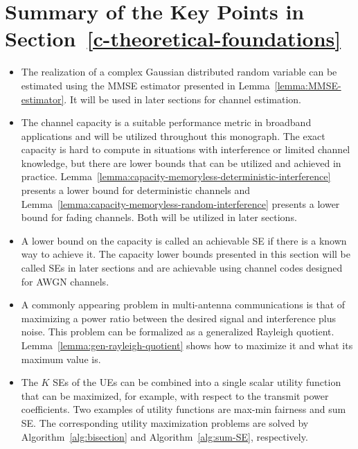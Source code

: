 \newpage

\section{Summary of the Key Points in Section~\ref{c-theoretical-foundations}}
\label{c-theoretical-foundations-summary}

\begin{mdframed}[style=GrayFrame]

\begin{itemize}
\item The realization of a complex Gaussian distributed random variable can be estimated using the \gls{MMSE} estimator presented in Lemma~\ref{lemma:MMSE-estimator}. It will be used in later sections for channel estimation.

\item The channel capacity is a suitable performance metric in broadband applications and will be utilized throughout this monograph. The exact capacity is hard to compute in situations with interference or limited channel knowledge, but there are lower bounds that can be utilized and achieved in practice. Lemma~\ref{lemma:capacity-memoryless-deterministic-interference} presents a lower bound for deterministic channels and Lemma~\ref{lemma:capacity-memoryless-random-interference} presents a lower bound for fading channels. Both will be utilized in later sections.

\item A lower bound on the capacity is called an achievable SE if there is a known way to achieve it. The capacity lower bounds presented in this section will be called SEs in later sections and are achievable using channel codes designed for AWGN channels.

\item A commonly appearing problem in multi-antenna communications is that of maximizing a power ratio between the desired signal and interference plus noise. This problem can be formalized as a generalized Rayleigh quotient. Lemma~\ref{lemma:gen-rayleigh-quotient} shows how to maximize it and what its maximum value is.


\item The $K$ SEs of the UEs can be combined into a single scalar utility function that can be maximized, for example, with respect to the transmit power coefficients. Two examples of utility functions are max-min fairness and sum SE. The corresponding utility maximization problems are solved by Algorithm~\ref{alg:bisection} and Algorithm~\ref{alg:sum-SE}, respectively.

\end{itemize}

\end{mdframed}
